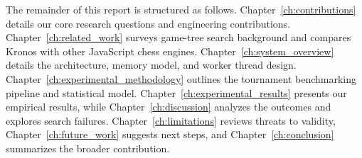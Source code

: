 The remainder of this report is structured as follows. Chapter~\ref{ch:contributions} details our core research questions and engineering contributions. Chapter~\ref{ch:related_work} surveys game-tree search background and compares Kronos with other JavaScript chess engines. Chapter~\ref{ch:system_overview} details the architecture, memory model, and worker thread design. Chapter~\ref{ch:experimental_methodology} outlines the tournament benchmarking pipeline and statistical model. Chapter~\ref{ch:experimental_results} presents our empirical results, while Chapter~\ref{ch:discussion} analyzes the outcomes and explores search failures. Chapter~\ref{ch:limitations} reviews threats to validity, Chapter~\ref{ch:future_work} suggests next steps, and Chapter~\ref{ch:conclusion} summarizes the broader contribution.
